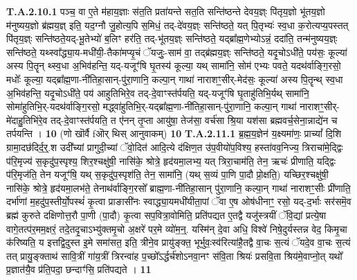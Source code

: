 \documentclass[17pt]{extarticle}
\begin{document}
                                \textbf{ T.A.2.10.1} \newline
                  पञ्च॒ वा ए॒ते म॑हाय॒ज्ञाः स॑त॒ति प्रता॑यन्ते सत॒ति सन्ति॑ष्ठन्ते देवय॒ज्ञ्ः पि॑तृय॒ज्ञो भू॑तय॒ज्ञो म॑नुष्यय॒ज्ञो ब्र॑ह्मय॒ज्ञ् इति॒ यद॒ग्नौ जु॒होत्य॒पि स॒मिधं॒ तद्-दे॑वय॒ज्ञ्ः सन्ति॑ष्ठते॒ यत् पि॒तृभ्यः॑ स्व॒धा क॒रोत्यप्य॒पस्तत् पि॑तृय॒ज्ञ्ः सन्ति॑ष्ठते॒यद्-भू॒तेभ्यो॑ ब॒लिꣳ हर॑ति॒ तद्-भू॑तय॒ज्ञ्ः सन्ति॑ष्ठते॒ यद्ब्रा᳚ह्म॒णेभ्योऽन्नं॒ ददा॑ति॒ तन्म॑नुष्यय॒ज्ञ्ः सन्ति॑ष्ठते॒ यथ्स्वा᳚द्ध्या॒य-मधी॑यी॒-तैका॑मप्यृ॒चं ॅयजुः॒-साम॑ वा॒ तद्ब्र॑ह्मय॒ज्ञ्ः सन्ति॑ष्ठते॒ यदृ॒चोऽधी॑ते॒ पय॑सः॒ कूल्या॑ अस्य पि॒तॄन् थ्स्व॒धा अ॒भिव॑हन्ति॒ यद्-यजूꣳ॑षि घृ॒तस्य॑ कूल्या॒ यथ् सामा॑नि॒ सोम॑ एभ्यः पवते॒ यदथ॑र्वाङ्गि॒रसो॒ मधोः᳚ कूल्या॒ यद्ब्रा᳚ह्म॒णा-नी॑तिहा॒सान्-पु॑रा॒णानि॒ कल्पा॒न् गाथा॑ नाराशꣳ॒॒सीर्-मेद॑सः॒ कूल्या॑ अस्य पि॒तॄन्थ् स्व॒धा अ॒भिव॑हन्ति॒ यदृ॒चोऽधी॑ते॒ पय॑ आहुतिभिरे॒व तद्-दे॒वाꣳस्त॑र्पयति॒ यद्-यजूꣳ॑षि घृ॒ताहु॑तिभि॒र्यथ् सामा॑नि॒ सोमा॑हुतिभि॒र्-यदथ॑र्वाङ्गि॒रसो॒ मद्ध्वा॑हुतिभि॒र्-यद्ब्रा᳚ह्म॒णा-नी॑तिहा॒सान्-पु॑रा॒णानि॒ कल्पा॒न् गाथा॑ नाराशꣳ॒॒सीर्-मे॑दाहु॒तिभि॑रे॒व तद्-दे॒वाꣳस्त॑र्पयति॒ त ए॑नन् तृ॒प्ता आयु॑षा॒ तेज॑सा॒ वर्च॑सा श्रि॒या यश॑सा ब्रह्मवर्च॒सेना॒न्नाद्ये॑न च तर्पयन्ति । \textbf{ 10} \newline
                  \newline
                                                        (णो खॊर्वै fऒर् थिस् आनुवाकम्) \textbf{10} \newline \newline
                                \textbf{ T.A.2.11.1} \newline
                  ब्र॒ह्म॒य॒ज्ञेन॑ य॒क्ष्यमा॑णः॒ प्राच्यां᳚ दि॒शि ग्रामा॒दछ॑दिर्द॒र्॒.श उदी᳚च्यां प्रागुदी॒च्यां ॅवो॒दित॑ आदि॒त्ये द॑क्षिण॒त उ॑प॒वीयो॑प॒विश्य॒ हस्ता॑वव॒निज्य॒ त्रिराचा॑मे॒द्द्विः प॑रि॒मृज्य॑ स॒कृदु॑प॒स्पृश्य॒ शिर॒श्चक्षु॑षी॒ नासि॑के॒ श्रोत्रे॒ हृद॑यमा॒लभ्य॒ यत् त्रिरा॒चाम॑ति॒ तेन॒ ऋचः॑ प्रीणाति॒ यद्द्विः प॑रि॒मृज॑ति॒ तेन यजूꣳ॑षि॒ यथ् स॒कृदु॑प॒स्पृश॑ति॒ तेन॒ सामा॑नि॒ (यथ् स॒व्यं पा॒णि पा॒दौ प्रो॒क्षति॒) यच्छिर॒श्चक्षु॑षी॒ नासि॑के॒ श्रोत्रे॒ हृद॑यमा॒लभ॑ते॒ तेनाथ॑र्वाङ्गि॒रसो᳚ ब्राह्म॒णा-नी॑तिहा॒सान् पु॑रा॒णानि॒ कल्पा॒न् गाथा॑ नाराशꣳ॒॒सीः प्री॑णाति॒ दर्भा॑णां म॒हदु॑प॒स्तीर्यो॒पस्थं॑ कृ॒त्वा प्राङासी॑नः स्वाद्ध्या॒यमधी॑यीता॒पां ॅवा ए॒ष ओष॑धीनाꣳ॒॒ रसो॒ यद्-द॒र्भाः सर॑समॆ॒व ब्रह्म॑ कुरुते दक्षिणोत्त॒रौ पा॒णी (पा॒दौ) कृ॒त्वा सप॒वित्रा॒वोमिति॒ प्रति॑पद्यत ए॒तद्वै यजु॑स्त्रयीं ॅवि॒द्यां प्रत्ये॒षा वागे॒तत्प॑र॒मम॒क्षरं॒ तदे॒तदृ॒चाऽभ्यु॑क्तमृ॒चो अ॒क्षरे॑ पर॒मे व्यो॑म॒न्॒. यस्मि॑न् दे॒वा अधि॒ विश्वे॑ निषे॒दुर्यस्तन्न वेद॒ किमृ॒चा क॑रिष्यति॒ य इत्तद्वि॒दुस्त इ॒मे समा॑सत॒ इति॒ त्रीने॒व प्रायु॑ङ्क्त॒ भूर्भुवः॒स्व॑रित्या॑है॒तद्वै वा॒चः स॒त्यं ॅयदे॒व वा॒चः स॒त्यं तत् प्रायु॒ङ्क्ताथ॑ सावि॒त्रीं गा॑य॒त्रीं त्रिरन्वा॑ह प॒च्छो᳚ऽर्द्धर्च॑शोऽनवा॒नꣳ स॑वि॒ता श्रियः॑ प्रसवि॒ता श्रिय॑मे॒वाप्नो॒त् यथो᳚ प्र॒ज्ञात॑यै॒व प्र॑ति॒पदा॒ छन्दाꣳ॑सि॒ प्रति॑पद्यते । \textbf{ 11} \newline
\end{document}
